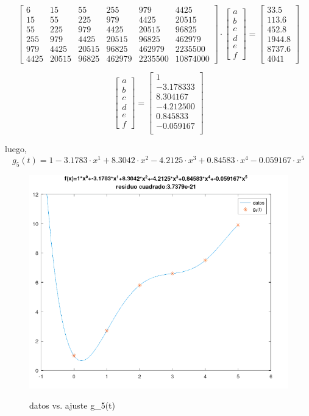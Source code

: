 \documentclass{article}
\begin{document}
\[
\begin{bmatrix}
    6 & 15 & 55 & 255 & 979 & 4425\\
    15 & 55 & 225 & 979 & 4425 & 20515\\
    55 & 225 & 979 & 4425 & 20515 & 96825 \\
    255 & 979 & 4425 & 20515 & 96825 & 462979 \\
    979 & 4425 & 20515 & 96825 & 462979 & 2235500 \\
    4425 & 20515 & 96825 & 462979 & 2235500 & 10874000 
\end{bmatrix}
\cdot
\begin{bmatrix}
    a \\ b \\ c \\ d \\ e \\ f
\end{bmatrix}
=
\begin{bmatrix}
    33.5 \\
    113.6 \\
    452.8 \\
    1944.8 \\
    8737.6 \\
    4041
\end{bmatrix}
\]

\[
\begin{bmatrix}
    a \\ b \\ c \\ d \\ e \\ f
\end{bmatrix}
=
\begin{bmatrix}
   1 \\
  -3.178333 \\
   8.304167 \\
  -4.212500 \\
   0.845833 \\
  -0.059167 \\
\end{bmatrix}
\]

luego,
\[g_5(t)=1-3.1783 \cdot x^1+8.3042 \cdot x^2 -4.2125 \cdot x^3+0.84583 \cdot x^4 -0.059167 \cdot x^5\]

\begin{figure}[H]
    \centering
    \includegraphics[width=0.6\linewidth]{grado.5.png}
    \label{fig:enter-label}
    \caption{datos vs. ajuste g_5(t)}
\end{figure}
\end{document}
